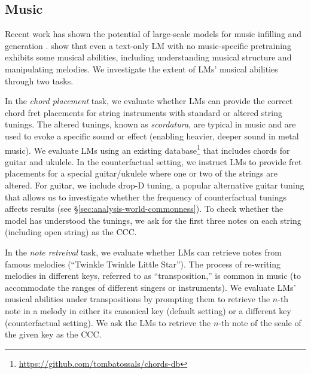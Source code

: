 \vspace{-1mm}
\subsection{Music} \label{sec:music-task}
\vspace{-1mm}

Recent work has shown the potential of large-scale models for music infilling \citep{DBLP:journals/corr/abs-1903-07227,huang2019bach} and generation \citep{agostinelli2023musiclm, copet2023simple,ren2020popmag}. \citet{bubeck2023sparks} show that even a text-only LM with no music-specific pretraining exhibits some musical abilities, including understanding musical structure and manipulating melodies. We investigate the extent of LMs' musical abilities
through two tasks. 



In the \emph{chord placement} task, we evaluate whether LMs can provide the correct chord fret placements for string instruments with standard or altered string tunings. The altered tunings, known as \emph{scordatura}, are typical in music and are used to evoke a specific sound or effect (\eg enabling heavier, deeper sound in metal music). We evaluate LMs using an existing database\footnote{\url{https://github.com/tombatossals/chords-db}} that includes chords for guitar and ukulele. In the counterfactual setting, we instruct  LMs to provide fret placements for a special guitar/ukulele where one or two of the strings are altered.
For guitar, we include drop-D tuning, a popular alternative guitar tuning that allows us to investigate whether the frequency of counterfactual tunings affects results (see \S\ref{sec:analysis-world-commonness}).
To check whether the model has understood the tunings, we ask for the first three notes on each string (including open string) as the CCC.

In the \emph{note retreival} task, we evaluate whether LMs can retrieve notes from famous melodies (\eg ``Twinkle Twinkle Little Star''). The process of re-writing melodies in different keys, referred to as ``transposition,'' is common in music (\eg to accommodate the ranges of different singers or instruments).
We evaluate LMs' musical abilities under transpositions by prompting them to retrieve the $n$-th note in a melody in either its canonical key (default setting) or a different key (counterfactual setting). 
We ask the LMs to retrieve the $n$-th note of the scale of the given key as the CCC. 

